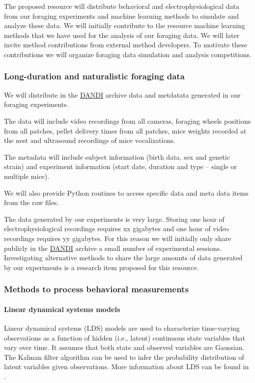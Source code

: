 
The proposed resource will distribute behavioral and electrophysiological data
from our foraging experiments and machine learning methods to simulate and analyze
these data. We will initially contribute to the resource machine learning
methods that we have used for the analysis of our foraging data. We will later
invite method contributions from external method developers. To motivate these
contributions we will organize foraging data simulation and analysis
competitions.

\subsubsection{Long-duration and naturalistic foraging data}

We will distribute in the \href{https://dandiarchive.org/}{DANDI} archive data
and metdatata generated in our foraging experiments.

The data will include
video recordings from all cameras,
foraging wheels positions from all patches,
pellet delivery times from all patches,
mice weights recorded at the nest and
ultrasound recordings of mice vocalizations.

The metadata will include
subject information (birth data, sex and genetic strain) and
experiment information (start date, duration and type -- single or multiple
mice).

We will also provide Python routines to access specific data and meta data
items from the raw files.

The data generated by our experiments is very large. Storing one hour of
electrophysiological recordings requires xx gigabytes and one hour of video
recordings requires yy gigabytes. For this reason we will initially only share
publicly in the \href{https://dandiarchive.org/}{DANDI} archive a small number
of experimental sessions.
%
Investigating alternative methods to share the large amounts of data generated
by our experiments is a research item proposed for this resource.

\subsubsection{Methods to process behavioral measurements}

\paragraph{Linear dynamical systems models}

Linear dynamical systems (LDS) models are used to characterize time-varying
observations as a function of hidden (i.e., latent) continuous state variables that vary
over time. It assumes that both state and observed variables are Gaussian. The
Kalman filter algorithm can be used to infer the probability distribution of
latent variables given observations. More information about LDS can be found in
\citep[][part I]{durbinAndKoopman12}.

